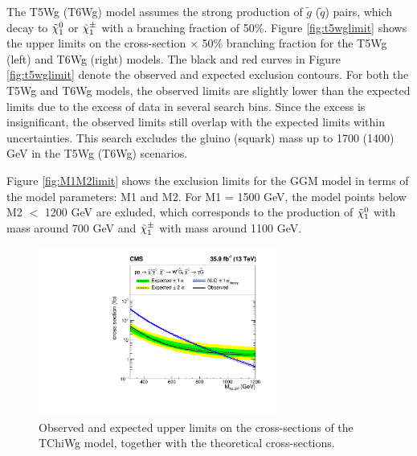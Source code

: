 \documentclass[thesis.tex]{subfiles}
\renewcommand\_{\textunderscore\allowbreak}
\begin{document}
The T5Wg (T6Wg) model assumes the strong production of $\tilde{g}$ ($\tilde{q}$) pairs, which decay to $\tilde{\chi}_1^0$ or $\tilde{\chi}_1^\pm$ with a branching fraction of 50\%. 
Figure \ref{fig:t5wglimit} shows the upper limits on the cross-section $\times$ 50\% branching fraction for the T5Wg (left) and T6Wg (right) models. 
The black and red curves in Figure \ref{fig:t5wglimit} denote the observed and expected exclusion contours. 
For both the T5Wg and T6Wg models, the observed limits are slightly lower than the expected limits due to the excess of data in several search bins.
Since the excess is insignificant, the observed limits still overlap with the expected limits within uncertainties. 
This search excludes the gluino (squark) mass up to 1700 (1400) GeV in the T5Wg (T6Wg) scenarios. 

Figure \ref{fig:M1M2limit} shows the exclusion limits for the GGM model in terms of the model parameters: M1 and M2.
For M1 = 1500 GeV, the model points below M2 $<$ 1200 GeV are exluded, which corresponds to the production of $\tilde{\chi}_1^0$ with mass around 700 GeV and $\tilde{\chi}_1^\pm$ with mass around 1100 GeV.  


\begin{figure}
  \centering
    \includegraphics[width=0.7\textwidth]{Fig/Figure_006.pdf}
		\caption{Observed and expected upper limits on the cross-sections of the TChiWg model, together with the theoretical cross-sections. }
    \label{fig:tchiwglimit}
\end{figure}
\end{document}
